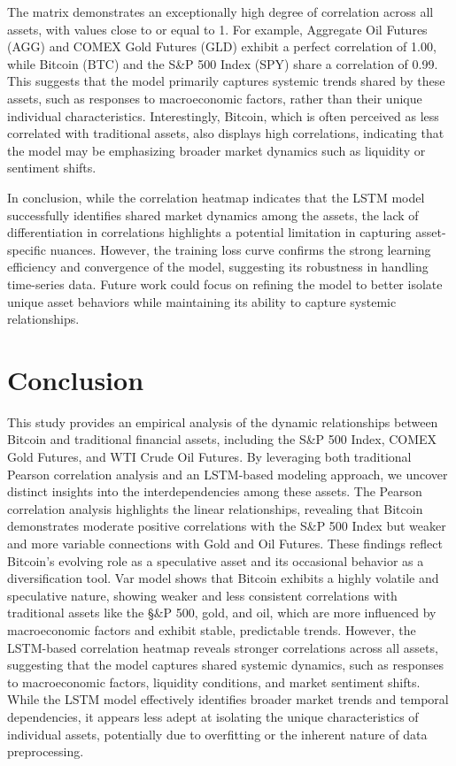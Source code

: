\documentclass{article}
\begin{document}
The matrix demonstrates an exceptionally high degree of correlation across all assets, with values close to or equal to 1. For example, Aggregate Oil Futures (AGG) and COMEX Gold Futures (GLD) exhibit a perfect correlation of 1.00, while Bitcoin (BTC) and the S\&P 500 Index (SPY) share a correlation of 0.99. This suggests that the model primarily captures systemic trends shared by these assets, such as responses to macroeconomic factors, rather than their unique individual characteristics. Interestingly, Bitcoin, which is often perceived as less correlated with traditional assets, also displays high correlations, indicating that the model may be emphasizing broader market dynamics such as liquidity or sentiment shifts.


In conclusion, while the correlation heatmap indicates that the LSTM model successfully identifies shared market dynamics among the assets, the lack of differentiation in correlations highlights a potential limitation in capturing asset-specific nuances. However, the training loss curve confirms the strong learning efficiency and convergence of the model, suggesting its robustness in handling time-series data. Future work could focus on refining the model to better isolate unique asset behaviors while maintaining its ability to capture systemic relationships.

\section{Conclusion}


This study provides an empirical analysis of the dynamic relationships between Bitcoin and traditional financial assets, including the S\&P 500 Index, COMEX Gold Futures, and WTI Crude Oil Futures. By leveraging both traditional Pearson correlation analysis and an LSTM-based modeling approach, we uncover distinct insights into the interdependencies among these assets. The Pearson correlation analysis highlights the linear relationships, revealing that Bitcoin demonstrates moderate positive correlations with the S\&P 500 Index but weaker and more variable connections with Gold and Oil Futures. These findings reflect Bitcoin’s evolving role as a speculative asset and its occasional behavior as a diversification tool. Var model shows that Bitcoin exhibits a highly volatile and speculative nature, showing weaker and less consistent correlations with traditional assets like the \S&P 500, gold, and oil, which are more influenced by macroeconomic factors and exhibit stable, predictable trends.
However, the LSTM-based correlation heatmap reveals stronger correlations across all assets, suggesting that the model captures shared systemic dynamics, such as responses to macroeconomic factors, liquidity conditions, and market sentiment shifts. While the LSTM model effectively identifies broader market trends and temporal dependencies, it appears less adept at isolating the unique characteristics of individual assets, potentially due to overfitting or the inherent nature of data preprocessing.
\end{document}
